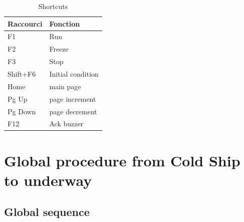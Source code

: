 \documentclass[12pt,a4paper]{article}
\begin{document}
    \begin{table}[htbp]
    \centering
    \footnotesize
        \begin{tabular}{|l|l|}
        \hline
        Raccourci & Fonction \\ \hline
        F1 & Run \\ \hline
        F2 & Freeze \\ \hline
        F3 & Stop \\ \hline
        Shift+F6 & Initial condition \\ \hline
        Home & main page \\ \hline
        Pg Up & page increment \\ \hline
        Pg Down & page decrement \\ \hline
        F12 & Ack buzzer \\ \hline
        \end{tabular}
    \label{Raccourcis clavier}
    \caption{Shortcuts}
    \end{table}



\section{Global procedure from Cold Ship to underway}

\subsection{Global sequence}
\end{document}
